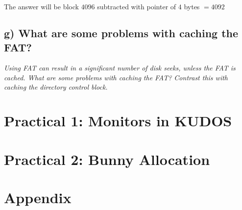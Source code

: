 \documentclass[11pt,a4paper]{article}
\theoremstyle{plain}
\theoremstyle{definition}
\theoremstyle{remark}
\numberwithin{equation}{section}
\begin{document}
The answer will be block $4096$ subtracted with pointer of $4$ bytes $= 4092$

\subsection*{g) What are some problems with caching the FAT?}
\textit{Using FAT can result in a significant number of disk seeks, unless the FAT is cached. What are some problems with caching the FAT? Contrast this with caching the directory control block.}


\section*{Practical 1: Monitors in KUDOS}




\section*{Practical 2: Bunny Allocation}



\section*{Appendix}




%
%
\end{document}
